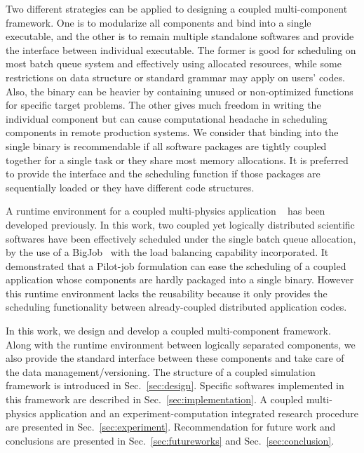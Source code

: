 \documentclass[10pt,conference]{IEEEtran}
\begin{document}
Two different strategies can be applied to designing a coupled multi-component 
framework. One is to modularize all components and bind into
a single executable, and the other is to remain multiple standalone softwares
and provide the interface between individual executable. 
The former is good for scheduling on most batch queue system and 
effectively using allocated resources, while some restrictions 
on data structure or standard grammar may apply on users' codes.
Also, the binary can be heavier by containing unused or non-optimized functions
for specific target problems. The other gives much freedom in writing 
the individual component but can cause computational headache in scheduling
components in remote production systems.
We consider that binding into the single binary is recommendable if
all software packages are tightly coupled together for a single task or
they share most memory allocations. It is preferred to provide
the interface and the scheduling function if those packages are
sequentially loaded or they have different code structures.

A runtime environment for a coupled multi-physics application
~\cite{CCGrid_Hybrid} has been developed previously. In this work,
two coupled yet logically distributed scientific softwares have been
effectively scheduled under the single batch queue allocation, 
by the use of a BigJob~\cite{saga_royalsoc} with the load balancing
capability incorporated. It demonstrated that a Pilot-job formulation
can ease the scheduling of a coupled application whose components are
hardly packaged into a single binary. However this runtime environment
lacks the reusability because it only provides the scheduling functionality
between already-coupled distributed application codes.

In this work, we design and develop a coupled multi-component framework.
Along with the runtime environment between logically separated components,
we also provide the standard interface between these components and
take care of the data management/versioning. The structure of
a coupled simulation framework is introduced in Sec.~\ref{sec:design}.
Specific softwares implemented in this framework are described in
Sec.~\ref{sec:implementation}. A coupled multi-physics application and
an experiment-computation integrated research procedure are presented
in Sec.~\ref{sec:experiment}. Recommendation for future work and 
conclusions are presented in Sec.~\ref{sec:futureworks} and
Sec.~\ref{sec:conclusion}.
\end{document}
